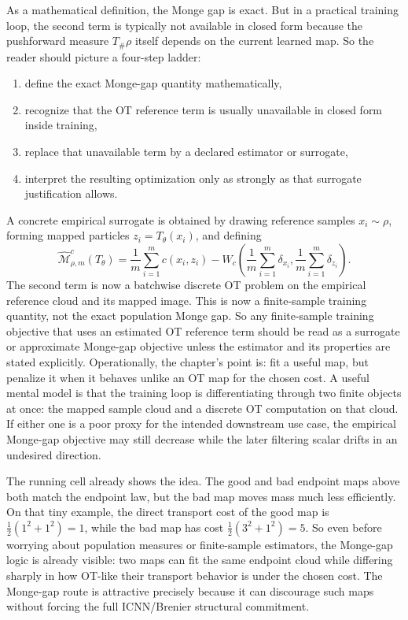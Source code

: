 As a mathematical definition, the Monge gap is exact.  But in a practical
training loop, the second term is typically not available in closed form because
the pushforward measure \(T_\#\rho\) itself depends on the current learned map.
So the reader should picture a four-step ladder:
\begin{enumerate}[label=(\roman*)]
  \item define the exact Monge-gap quantity mathematically,
  \item recognize that the OT reference term is usually unavailable in closed form
    inside training,
  \item replace that unavailable term by a declared estimator or surrogate,
  \item interpret the resulting optimization only as strongly as that surrogate
    justification allows.
\end{enumerate}
A concrete empirical surrogate is obtained by drawing reference samples
\(x_i\sim\rho\), forming mapped particles \(z_i=T_\theta(x_i)\), and defining
\begin{equation}
\label{eq:bf-neural-ot-direct-monge-gap-empirical}
  \widehat{\mathcal M}_{\rho,m}^c(T_\theta)
  =
  \frac{1}{m}\sum_{i=1}^m c(x_i,z_i)
  -
  W_c\!\left(\frac{1}{m}\sum_{i=1}^m\delta_{x_i},
  \frac{1}{m}\sum_{i=1}^m\delta_{z_i}\right).
\end{equation}
The second term is now a batchwise discrete OT problem on the empirical reference
cloud and its mapped image.  This is now a finite-sample training quantity, not the
exact population Monge gap.  So any finite-sample training objective that uses an
estimated OT reference term should be read as a surrogate or approximate Monge-gap
objective unless the estimator and its properties are stated explicitly.
Operationally, the chapter’s point is: fit a useful map, but penalize it when it
behaves unlike an OT map for the chosen cost.  A useful mental model is that the
training loop is differentiating through two finite objects at once: the mapped
sample cloud and a discrete OT computation on that cloud.  If either one is a poor
proxy for the intended downstream use case, the empirical Monge-gap objective may
still decrease while the later filtering scalar drifts in an undesired direction.

The running cell already shows the idea.  The good and bad endpoint maps above
both match the endpoint law, but the bad map moves mass much less efficiently.  On
that tiny example, the direct transport cost of the good map is
\(\frac{1}{2}(1^2+1^2)=1\), while the bad map has cost
\(\frac{1}{2}(3^2+1^2)=5\).  So even before worrying about population measures or
finite-sample estimators, the Monge-gap logic is already visible: two maps can fit
the same endpoint cloud while differing sharply in how OT-like their transport
behavior is under the chosen cost.  The Monge-gap route is attractive precisely
because it can discourage such maps without forcing the full ICNN/Brenier
structural commitment.

